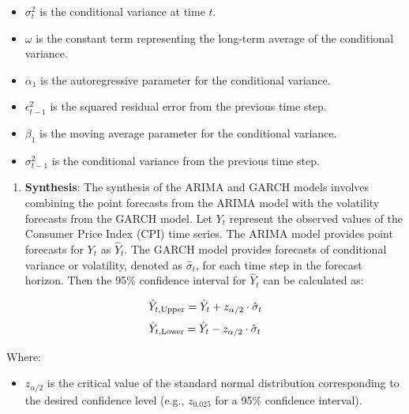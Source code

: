 \documentclass[11pt,preprint, authoryear]{elsarticle}
\numberwithin{equation}{section}
\numberwithin{figure}{section}
\numberwithin{table}{section}
\def\tightlist{} %
\begin{document}
\begin{itemize}
\tightlist
\item
  \(\sigma_t^2\) is the conditional variance at time \(t\).
\item
  \(\omega\) is the constant term representing the long-term average of
  the conditional variance.
\item
  \(\alpha_1\) is the autoregressive parameter for the conditional
  variance.
\item
  \(\epsilon_{t-1}^2\) is the squared residual error from the previous
  time step.
\item
  \(\beta_1\) is the moving average parameter for the conditional
  variance.
\item
  \(\sigma_{t-1}^2\) is the conditional variance from the previous time
  step.
\end{itemize}

\hfill

\begin{enumerate}
\def\labelenumi{\arabic{enumi}.}
\setcounter{enumi}{2}
\tightlist
\item
  \textbf{Synthesis}: The synthesis of the ARIMA and GARCH models
  involves combining the point forecasts from the ARIMA model with the
  volatility forecasts from the GARCH model. Let \(Y_t\) represent the
  observed values of the Consumer Price Index (CPI) time series. The
  ARIMA model provides point forecasts for \(Y_t\) as \(\hat{Y}_t\). The
  GARCH model provides forecasts of conditional variance or volatility,
  denoted as \(\hat{\sigma}_t\), for each time step in the forecast
  horizon. Then the 95\% confidence interval for \(\hat{Y}_t\) can be
  calculated as:
\end{enumerate}

\[
\hat{Y}_{t, \text{Upper}} = \hat{Y}_t + z_{\alpha/2} \cdot \hat{\sigma}_t \\
\] \[
\hat{Y}_{t, \text{Lower}} = \hat{Y}_t - z_{\alpha/2} \cdot \hat{\sigma}_t \\
\]

Where:

\begin{itemize}
\tightlist
\item
  \(z_{\alpha/2}\) is the critical value of the standard normal
  distribution corresponding to the desired confidence level (e.g.,
  \(z_{0.025}\) for a 95\% confidence interval).
\end{itemize}


\end{document}
